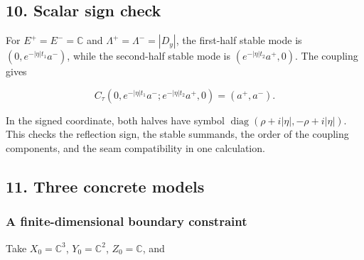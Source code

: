 \documentclass[
  11pt,
]{article}
\makeatletter
\let\ReaderOriginalAnchorStart\hyper@anchorstart
\let\ReaderOriginalAnchorEnd\hyper@anchorend
\let\ReaderPendingAliases\@empty
\def\ReaderArmAliases#1{\gdef\ReaderPendingAliases{#1}}
\def\hyper@anchorstart#1{\ReaderIfNativeAnchorTF{#1}{\ReaderPendingAliases\global\let\ReaderPendingAliases\@empty}{}\ReaderOriginalAnchorStart{#1}}
\makeatother
\begin{document}
\ReaderArmAliases{\ReaderOriginalAnchorStart{AN03-SDI-010}\ReaderOriginalAnchorEnd\begingroup\expandafter\def\csname @currentHref\endcsname{AN03-SDI-010}\label{AN03-SDI-010}\endgroup\ReaderOriginalAnchorStart{10-scalar-sign-check}\ReaderOriginalAnchorEnd\begingroup\expandafter\def\csname @currentHref\endcsname{10-scalar-sign-check}\label{10-scalar-sign-check}\endgroup\ReaderOriginalAnchorStart{scalar-sign-check}\ReaderOriginalAnchorEnd}
\subsection{10. Scalar sign check}\label{scalar-sign-check}

For \(E^+=E^-=\mathbb C\) and \(\Lambda^+=\Lambda^-=|D_y|\), the
first-half stable mode is \((0,e^{-|\eta|t_1}a^-)\), while the
second-half stable mode is \((e^{-|\eta|t_2}a^+,0)\). The coupling gives

\[
 C_\tau(0,e^{-|\eta|t_1}a^-;
        e^{-|\eta|t_2}a^+,0)=(a^+,a^-).
 \tag{DI46}
\]

In the signed coordinate, both halves have symbol
\(\operatorname{diag}(\rho+i|\eta|,-\rho+i|\eta|)\). This checks the
reflection sign, the stable summands, the order of the coupling
components, and the seam compatibility in one calculation.

\ReaderArmAliases{\ReaderOriginalAnchorStart{AN03-SDI-011}\ReaderOriginalAnchorEnd\begingroup\expandafter\def\csname @currentHref\endcsname{AN03-SDI-011}\label{AN03-SDI-011}\endgroup\ReaderOriginalAnchorStart{11-three-concrete-models}\ReaderOriginalAnchorEnd\begingroup\expandafter\def\csname @currentHref\endcsname{11-three-concrete-models}\label{11-three-concrete-models}\endgroup\ReaderOriginalAnchorStart{three-concrete-models}\ReaderOriginalAnchorEnd}
\subsection{11. Three concrete models}\label{three-concrete-models}

\ReaderArmAliases{\ReaderOriginalAnchorStart{a-finite-dimensional-boundary-constraint}\ReaderOriginalAnchorEnd}
\subsubsection{A finite-dimensional boundary
constraint}\label{a-finite-dimensional-boundary-constraint}

Take \(X_0=\mathbb C^3\), \(Y_0=\mathbb C^2\), \(Z_0=\mathbb C\), and
\end{document}
